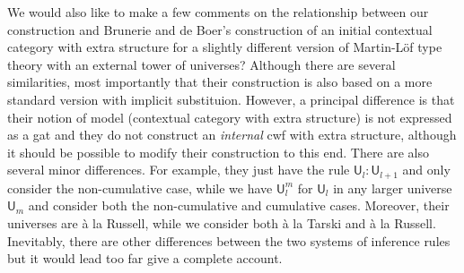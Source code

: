 \documentclass[11pt,a4paper]{article}
\theoremstyle{plain}
\theoremstyle{definition}
\newcommand{\UU}{\mathsf{U}}
\def\UU{\mathsf{U}}
\begin{document}
We would also like to make a few comments on the relationship between our construction and Brunerie and de Boer's \cite{Brunerie:initiality,deBoer:lic} construction of an initial contextual category with extra structure for a slightly different version of Martin-Löf type theory with an external tower of universes? Although there are several similarities, most importantly that their construction is also based on a more standard version with implicit substituion. However, a principal difference is that their notion of model (contextual category with extra structure) is not expressed as a gat and they do not construct an {\em internal} cwf with extra structure, although it should be possible to modify their construction to this end. There are also several minor differences. For example, they just have the rule $\UU_l : \UU_{l+1}$ and only consider the non-cumulative case, while we have $\UU_l^m$ for $\UU_l$ in any larger universe $\UU_m$ and consider both the non-cumulative and cumulative cases.
Moreover, their universes are \`a la Russell, while we consider both \`a la Tarski and \`a la Russell. Inevitably, there are other differences between the two systems of inference rules but it would lead too far give a complete account. 

%
\end{document}
